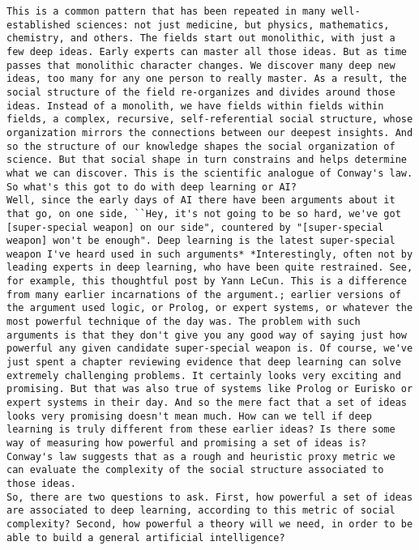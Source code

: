 \begin{lstlisting}
This is a common pattern that has been repeated in many well-established sciences: not just medicine, but physics, mathematics, chemistry, and others. The fields start out monolithic, with just a few deep ideas. Early experts can master all those ideas. But as time passes that monolithic character changes. We discover many deep new ideas, too many for any one person to really master. As a result, the social structure of the field re-organizes and divides around those ideas. Instead of a monolith, we have fields within fields within fields, a complex, recursive, self-referential social structure, whose organization mirrors the connections between our deepest insights. And so the structure of our knowledge shapes the social organization of science. But that social shape in turn constrains and helps determine what we can discover. This is the scientific analogue of Conway's law. 
So what's this got to do with deep learning or AI?
Well, since the early days of AI there have been arguments about it that go, on one side, ``Hey, it's not going to be so hard, we've got [super-special weapon] on our side", countered by "[super-special weapon] won't be enough". Deep learning is the latest super-special weapon I've heard used in such arguments* *Interestingly, often not by leading experts in deep learning, who have been quite restrained. See, for example, this thoughtful post by Yann LeCun. This is a difference from many earlier incarnations of the argument.; earlier versions of the argument used logic, or Prolog, or expert systems, or whatever the most powerful technique of the day was. The problem with such arguments is that they don't give you any good way of saying just how powerful any given candidate super-special weapon is. Of course, we've just spent a chapter reviewing evidence that deep learning can solve extremely challenging problems. It certainly looks very exciting and promising. But that was also true of systems like Prolog or Eurisko or expert systems in their day. And so the mere fact that a set of ideas looks very promising doesn't mean much. How can we tell if deep learning is truly different from these earlier ideas? Is there some way of measuring how powerful and promising a set of ideas is? Conway's law suggests that as a rough and heuristic proxy metric we can evaluate the complexity of the social structure associated to those ideas.
So, there are two questions to ask. First, how powerful a set of ideas are associated to deep learning, according to this metric of social complexity? Second, how powerful a theory will we need, in order to be able to build a general artificial intelligence?

\end{lstlisting}
